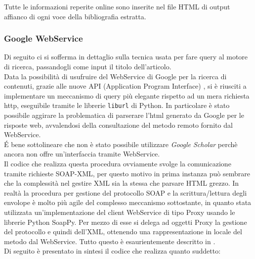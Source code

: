 Tutte le informazioni reperite online sono inserite nel file HTML di output affianco di ogni voce della bibliografia estratta.
\\

\subsubsection{Google WebService}

Di seguito ci si sofferma in dettaglio sulla tecnica usata per fare query al motore di ricerca, passandogli come input il titolo dell'articolo.
\\ 
Data la possibilità di usufruire del WebService di Google per la ricerca di contenuti, grazie alle nuove API (Application Program Interface) \cite{GWS}, si è riusciti a implementare un meccanismo di query più elegante rispetto ad un mera richiesta http, eseguibile tramite le librerie \texttt{liburl} di Python. In particolare è stato possibile aggirare la problematica di parserare l'html generato da Google per le risposte web, avvalendosi della consultazione del metodo remoto fornito dal WebService.
\\
\'E bene sottolineare che non è stato possibile utilizzare \textit{Google Scholar} perchè ancora non offre un'interfaccia  tramite WebService.
\\
Il codice che realizza questa procedura ovviamente svolge la comunicazione tramite richieste SOAP-XML, per questo motivo in prima instanza può sembrare che la complessità nel gestire XML sia la stessa che parsare HTML grezzo. In realtà la procedura per gestione del protocollo SOAP e la scrittura/lettura degli envolope è molto più agile del complesso meccanismo sottostante, in quanto stata utilizzata un'implementazione del client WebService di tipo Proxy usando le librerie Python SoapPy. Per mezzo di esse si delega ad oggetti Proxy la gestione del protocollo e quindi dell'XML, ottenendo una rappresentazione in locale del metodo dal WebService. Tutto questo è esaurientemente descritto in \cite{ibm-py-ws}.
\\
Di seguito è presentato in sintesi il codice che realizza quanto suddetto:

